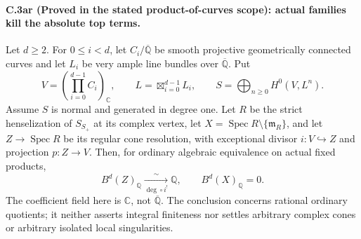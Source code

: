 \paragraph{C.3ar (Proved in the stated product-of-curves scope): actual families kill the absolute top terms.}
Let $d\ge2$. For $0\le i<d$, let $C_i/\overline{\mathbb Q}$ be
smooth projective geometrically connected curves and let $L_i$ be
very ample line bundles over $\overline{\mathbb Q}$. Put
\[
 V=\left(\prod_{i=0}^{d-1}C_i\right)_{\mathbb C},
 \qquad L=\boxtimes_{i=0}^{d-1}L_i,
 \qquad S=\bigoplus_{n\ge0}H^0(V,L^n).
\]
Assume $S$ is normal and generated in degree one. Let $R$ be the
strict henselization of $S_{S_+}$ at its complex vertex, let
$X=\operatorname{Spec}R\setminus\{\mathfrak m_R\}$, and let
$Z\to\operatorname{Spec}R$ be its regular cone resolution, with
exceptional divisor $i:V\hookrightarrow Z$ and projection $p:Z\to V$.
Then, for ordinary algebraic equivalence on actual fixed products,
\begin{equation}\label{eq:C3ar-answer}
 B^d(Z)_{\mathbb Q}\xrightarrow[\deg\circ i^!]{\ \sim\ }\mathbb Q,
 \qquad B^d(X)_{\mathbb Q}=0.
\end{equation}
The coefficient field here is $\mathbb C$, not
$\overline{\mathbb Q}$. The conclusion concerns rational ordinary
quotients; it neither asserts integral finiteness nor settles arbitrary
complex cones or arbitrary isolated local singularities.

